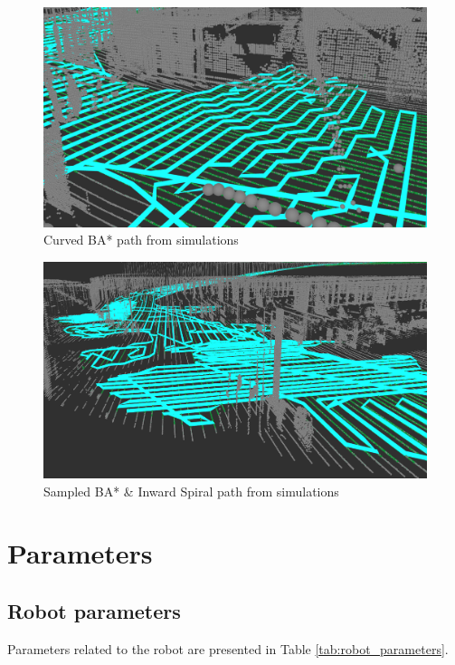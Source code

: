 \begin{figure}
    \centering
    \includegraphics[width=\textwidth]{figures/example_curvedbastar.png}
    \caption{Curved BA* path from simulations}
    \label{fig:example_curvedbastar}
\end{figure}

\begin{figure}
    \centering
    \includegraphics[width=\textwidth]{figures/example_randombastar.png}
    \caption{Sampled BA* \& Inward Spiral path from simulations}
    \label{fig:example_randombastar}
\end{figure}

\section{Parameters}

\subsection{Robot parameters}
Parameters related to the robot are presented in Table \ref{tab:robot_parameters}.

